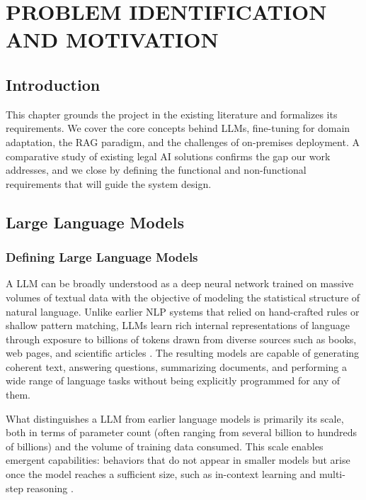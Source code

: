 \chapter{PROBLEM IDENTIFICATION AND MOTIVATION}

\section{Introduction}
\label{sec:ch2-introduction}

This chapter grounds the project in the existing literature and formalizes its
requirements. We cover the core concepts behind \ac{LLM}s, fine-tuning for domain
adaptation, the \ac{RAG} paradigm, and the challenges of on-premises deployment.
A comparative study of existing legal \ac{AI} solutions confirms the gap our work
addresses, and we close by defining the functional and non-functional requirements
that will guide the system design.

\section{Large Language Models}
\label{sec:llm-overview}

\subsection{Defining Large Language Models}

A \ac{LLM} can be broadly understood as a deep neural network trained on
massive volumes of textual data with the objective of modeling the statistical
structure of natural language. Unlike earlier \ac{NLP} systems that relied on
hand-crafted rules or shallow pattern matching, \ac{LLM}s learn rich internal
representations of language through exposure to billions of tokens drawn from
diverse sources such as books, web pages, and scientific articles
\cite{brown2020gpt3}. The resulting models are capable of generating coherent
text, answering questions, summarizing documents, and performing a wide range
of language tasks without being explicitly programmed for any of them.

\vspace{1em}

What distinguishes a \ac{LLM} from earlier language models is primarily
its scale, both in terms of parameter count (often ranging from several
billion to hundreds of billions) and the volume of training data consumed.
This scale enables emergent capabilities: behaviors that do not appear in
smaller models but arise once the model reaches a sufficient size, such as
in-context learning and multi-step reasoning \cite{brown2020gpt3}.

